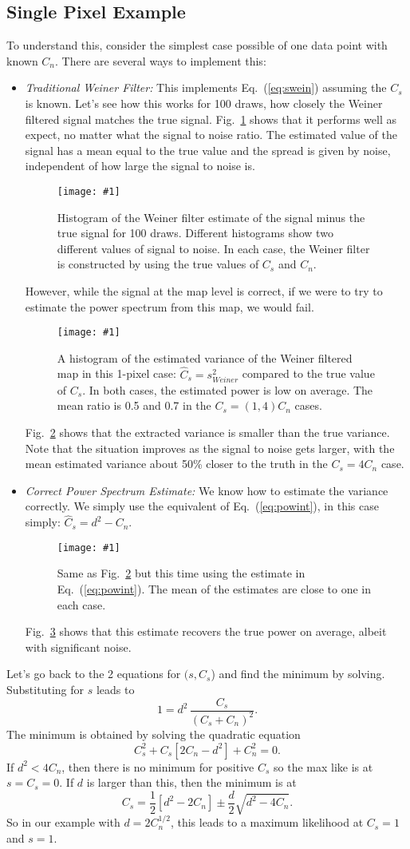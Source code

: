 \documentclass[11pt, oneside]{article}   	%
\def\be{\begin{equation}}
\def\ee{\end{equation}}
\newcommand{\ec}[1]{Eq.~(\ref{eq:#1})}
\newcommand{\sfig}[2]{
\texttt{[image: \#1]}
        }
\newcommand{\Spng}[2]{
   \begin{figure}[thbp]
   \begin{center}
    \sfig{#1.png}{0.7\columnwidth}
    \caption{{\small #2}}
    \label{fig:#1}
     \end{center}
   \end{figure}
}
\newcommand{\rf}[1]{\ref{fig:#1}}
\newcommand\bei{\begin{itemize}}
\newcommand\eei{\end{itemize}}
\begin{document}
\subsection{Single Pixel Example}

To understand this, consider the simplest case possible of one data point with known $C_n$. There are several ways to implement this:
\bei
\item {\it Traditional Weiner Filter:} This implements \ec{swein} assuming the $C_s$ is known. Let's see how this works for 100 draws, how closely the Weiner filtered signal matches the true signal. Fig.~\rf{swein} shows that it performs well as expect, no matter what the signal to noise ratio. The estimated value of the signal has a mean equal to the true value and the spread is given by noise, independent of how large the signal to noise is.
\Spng{swein}{Histogram of the Weiner filter estimate of the signal minus the true signal for 100 draws. Different histograms show two different values of signal to noise. In each case, the Weiner filter is constructed by using the true values of $C_s$ and $C_n$.}
However, while the signal at the map level is correct, if we were to try to estimate the power spectrum from this map, we would fail.
\Spng{wpow}{A histogram of the estimated variance of the Weiner filtered map in this 1-pixel case: $\hat C_s=s_{Weiner}^2$ compared to the true value of $C_s$. In both cases, the estimated power is low on average. The mean ratio is 0.5 and 0.7 in the $C_s=(1,4)C_n$ cases.}
Fig.~\rf{wpow} shows that the extracted variance is smaller than the true variance. Note that the situation improves as the signal to noise gets larger, with the mean estimated variance about 50\% closer to the truth in the $C_s=4C_n$ case.
\item {\it Correct Power Spectrum Estimate:} We know how to estimate the variance correctly. We simply use the equivalent of \ec{powint}, in this case simply: $\hat C_s=d^2-C_n$.
\Spng{pow}{Same as Fig.~\rf{wpow} but this time using the estimate in \ec{powint}. The mean of the estimates are close to one in each case.}
Fig.~\rf{pow} shows that this estimate recovers the true power on average, albeit with significant noise.
\eei

Let's go back to the 2 equations for $(s,C_s$) and find the minimum by solving. Substituting for $s$ leads to
\be
1 = d^2 \,\frac{C_s}{(C_s+C_n)^2}.\ee
The minimum is obtained by solving the quadratic equation
\be
C_s^2 + C_s\left[ 2C_n -d^2\right] +C_n^2 = 0.
\ee
If $d^2<4C_n$, then there is no minimum for positive $C_s$ so the max like is at $s=C_s=0$. If $d$ is larger than this, then the minimum is at 
\be
C_s = \frac12 \left[ d^2-2C_n\right] \pm \frac{d}2\sqrt{d^2-4C_n}
.\ee
So in our example with $d=2C_n^{1/2}$, this leads to a maximum likelihood at $C_s=1$ and $s=1$.
\end{document}
